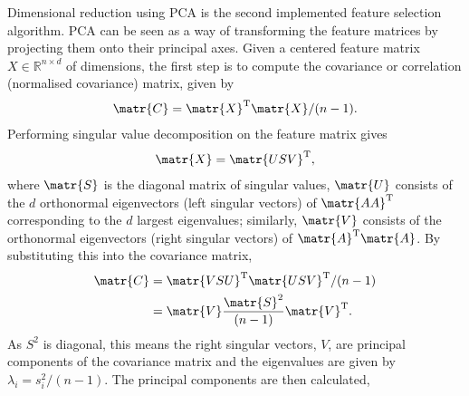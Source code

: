         
        Dimensional reduction using PCA is the second implemented feature selection algorithm. PCA can be seen as a way of transforming the feature matrices by projecting them onto their principal axes. Given a centered feature matrix $X\in\mathbb{R}^{n\times d}$ of dimensions, the first step is to compute the covariance or correlation (normalised covariance) matrix, given by
        \begin{align}
            \matr{C} = \matr{X}^\text{T}\matr{X}/(n-1).
        \end{align}
        Performing singular value decomposition on the feature matrix gives
        \begin{align}
            \matr{X} = \matr{USV}^\text{T},
        \end{align}
        where $\matr{S}$ is the diagonal matrix of singular values, $\matr{U}$ consists of the $d$ orthonormal eigenvectors (left singular vectors) of $\matr{AA}^\text{T}$ corresponding to the $d$ largest eigenvalues; similarly, $\matr{V}$ consists of the orthonormal eigenvectors (right singular vectors) of $\matr{A}^\text{T}\matr{A}$. By substituting this into the covariance matrix,
        \begin{align}
            \matr{C} &= \matr{VSU}^\text{T}\matr{USV}^\text{T}/(n-1)\\
              &= \matr{V}\frac{\matr{S}^2}{(n-1)}\matr{V}^\text{T}.
        \end{align}
        As $S^2$ is diagonal, this means the right singular vectors, $V$, are principal components of the covariance matrix and the eigenvalues are given by $\lambda_i = s^2_i/(n-1)$. The principal components are then calculated,
        \begin{align}
            
        \end{align}
                    
